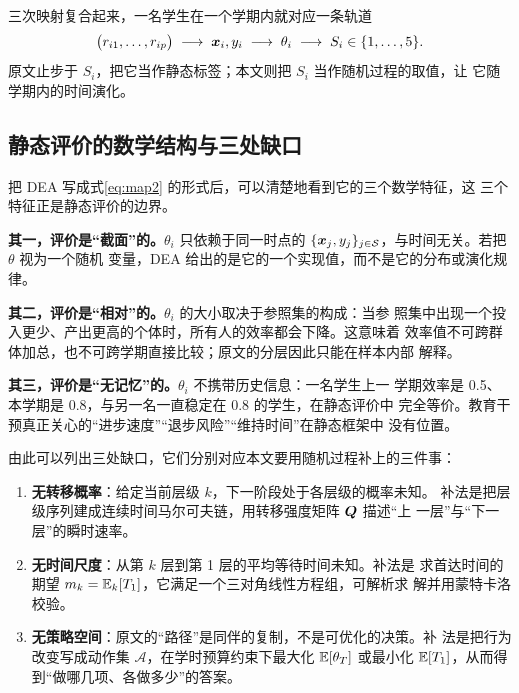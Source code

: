 三次映射复合起来，一名学生在一个学期内就对应一条轨道
\begin{equation}
\bigl(r_{i1},\dots,r_{ip}\bigr)\;\longrightarrow\;\bm{x}_i,y_i
\;\longrightarrow\;\theta_i\;\longrightarrow\;S_i\in\{1,\dots,5\}.
\label{eq:track}
\end{equation}
原文止步于 $S_i$，把它当作静态标签；本文则把 $S_i$ 当作随机过程的取值，让
它随学期内的时间演化。

\subsection{静态评价的数学结构与三处缺口}

把 DEA 写成式\eqref{eq:map2} 的形式后，可以清楚地看到它的三个数学特征，这
三个特征正是静态评价的边界。

\textbf{其一，评价是“截面”的。}$\theta_i$ 只依赖于同一时点的
$\{\bm{x}_j,y_j\}_{j\in\mathcal{S}}$，与时间无关。若把 $\theta$ 视为一个随机
变量，DEA 给出的是它的一个实现值，而不是它的分布或演化规律。

\textbf{其二，评价是“相对”的。}$\theta_i$ 的大小取决于参照集的构成：当参
照集中出现一个投入更少、产出更高的个体时，所有人的效率都会下降。这意味着
效率值不可跨群体加总，也不可跨学期直接比较；原文的分层因此只能在样本内部
解释。

\textbf{其三，评价是“无记忆”的。}$\theta_i$ 不携带历史信息：一名学生上一
学期效率是 0.5、本学期是 0.8，与另一名一直稳定在 0.8 的学生，在静态评价中
完全等价。教育干预真正关心的“进步速度”“退步风险”“维持时间”在静态框架中
没有位置。

由此可以列出三处缺口，它们分别对应本文要用随机过程补上的三件事：

\begin{enumerate}[label=（\arabic*）,itemsep=2pt,topsep=2pt,leftmargin=3em]
\item \textbf{无转移概率}：给定当前层级 $k$，下一阶段处于各层级的概率未知。
  补法是把层级序列建成连续时间马尔可夫链，用转移强度矩阵 $\bm{Q}$ 描述“上
  一层”与“下一层”的瞬时速率。
\item \textbf{无时间尺度}：从第 $k$ 层到第 1 层的平均等待时间未知。补法是
  求首达时间的期望 $m_k=\mathbb{E}_k[T_1]$，它满足一个三对角线性方程组，可解析求
  解并用蒙特卡洛校验。
\item \textbf{无策略空间}：原文的“路径”是同伴的复制，不是可优化的决策。补
  法是把行为改变写成动作集 $\mathcal{A}$，在学时预算约束下最大化
  $\mathbb{E}[\theta_T]$ 或最小化 $\mathbb{E}[T_1]$，从而得到“做哪几项、各做多少”的答案。
\end{enumerate}

